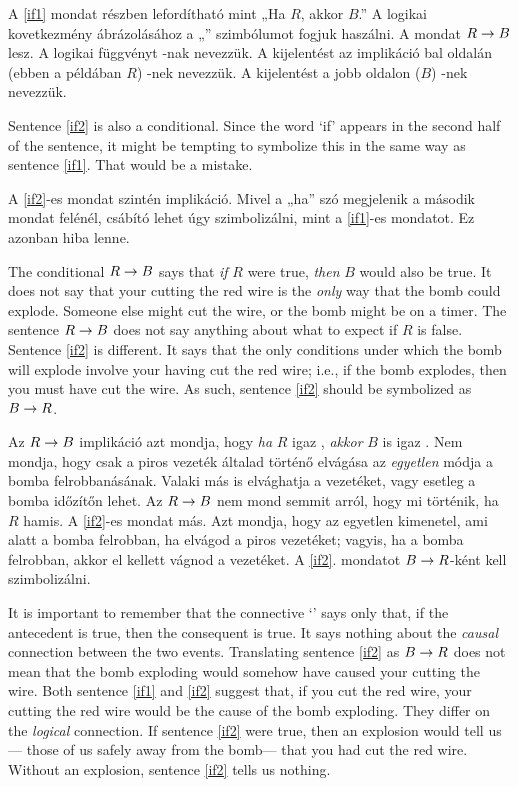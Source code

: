 A \ref{if1} mondat részben lefordítható mint „Ha $R$, akkor $B$.” A logikai kovetkezmény ábrázolásához a „\eif” szimbólumot fogjuk haszálni.
A mondat $R\rightarrow B$ lesz. A  logikai függvényt -nak nevezzük. A kijelentést az implikáció bal oldalán (ebben a példában $R$) -nek
nevezzük.  A kijelentést a jobb oldalon ($B$) -nek nevezzük.


Sentence \ref{if2} is also a conditional. Since the word `if' appears in the second half of the sentence, it might be tempting to symbolize this in the same way as sentence \ref{if1}. That would be a mistake.

A \ref{if2}-es mondat szintén implikáció. Mivel a „ha” szó megjelenik a második mondat felénél, csábító lehet úgy szimbolizálni, mint a \ref{if1}-es mondatot. Ez azonban hiba lenne.


The conditional $R\rightarrow B$ says that \emph{if} $R$ were true, \emph{then} $B$ would also be true. It does not say that your cutting the red wire is the \emph{only} way that the bomb could explode. Someone else might cut the wire, or the bomb might be on a timer. The sentence $R\rightarrow B$ does not say anything about 
what to expect if $R$ is false. Sentence \ref{if2} is different. It says that the only conditions under which the bomb will explode involve your having cut the red wire; i.e., if the bomb explodes, then you must have cut the wire. As such, sentence \ref{if2} should be symbolized as $B \rightarrow R$.

Az $R\rightarrow B$ implikáció azt mondja, hogy \emph{ha} $R$ igaz , \emph{akkor} $B$ is igaz . Nem mondja, hogy
csak a piros vezeték általad történő elvágása az \emph{egyetlen} módja a bomba felrobbanásának. Valaki 
más is elvághatja a vezetéket, vagy esetleg a bomba időzítőn lehet. Az $R\rightarrow B$ nem mond
semmit arról, hogy mi történik, ha $R$ hamis. A \ref{if2}-es mondat más. Azt mondja, hogy az egyetlen kimenetel, ami alatt a bomba felrobban, ha elvágod a piros vezetéket; vagyis, ha a bomba felrobban, akkor el kellett vágnod a vezetéket. A \ref{if2}. mondatot 
$B \rightarrow R$-ként kell szimbolizálni.



It is important to remember that the connective `\eif' says only that, if the antecedent is true, then the consequent is true. It says nothing about the \emph{causal} connection between the two events. Translating sentence \ref{if2} as $B \rightarrow R$ does not mean that the bomb exploding would somehow have caused your cutting the wire. Both sentence \ref{if1} and \ref{if2} suggest that, if you cut the red wire, your cutting the red wire would be the cause of the bomb exploding. They differ on the \emph{logical} connection. If sentence \ref{if2} were true, then an explosion would tell us--- those of us safely away from the bomb--- that you had cut the red wire. Without an explosion, sentence \ref{if2} tells us nothing.

